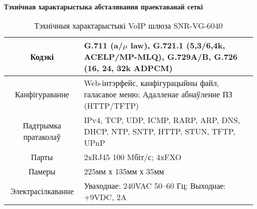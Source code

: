 \vspace{-0.8\baselineskip}
\begin{center}
    \textbf{Тэхнічная характарыстыка абсталявання праектаванай сеткі}
\end{center}

\vspace{-0.5\baselineskip}
\begin{table}[h!]
    \renewcommand{\thetable}{Г.1}
    \caption{Тэхнічныя характарыстыкі VoIP шлюза SNR-VG-6040}
    \begin{tabularx}{\textwidth}{|c|>{\centering\arraybackslash}X|}
        \hline
        Кодэкі & G.711 (a/$\mu$ law), G.721.1 (5,3/6,4k, ACELP/MP-MLQ),
                 G.729A/B, G.726 (16, 24, 32k ADPCM) \\
        \hline
        Канфігураванне & Web-інтэрфейс, канфігурацыйны файл, галасавое меню;
                         Адалленае абнаўленне ПЗ (HTTP/TFTP) \\
        \hline
        Падтрымка пратаколаў & IPv4, TCP, UDP, ICMP, RARP, ARP, DNS,
                               DHCP, NTP, SNTP, HTTP, STUN, TFTP, UPnP \\
        \hline
        Парты & 2xRJ45 100 Mбіт/с; 4xFXO \\
        \hline
        Памеры & 225мм х 135мм х 35мм \\
        \hline
        Электрасілкаванне & Уваходнае: 240VAC 50--60 Гц;
                            Выходнае: +9VDC, 2A \\
                          
        \hline
    \end{tabularx}
    \label{table: SNR-VG-6040}
\end{table}
